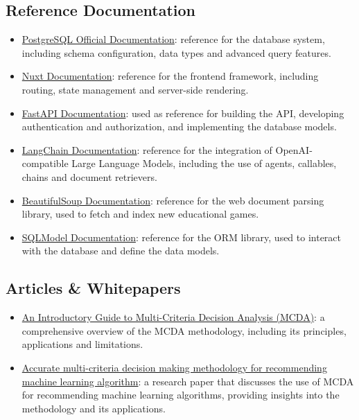 \documentclass[11pt,italian,a4paper]{article}
\begin{document}
\subsection{Reference Documentation}
\begin{itemize}
    \item \href{https://www.postgresql.org/docs/current/}{PostgreSQL Official Documentation}: reference for the database system, including schema configuration, data types and advanced query features.
    \item \href{https://nuxt.com/docs/getting-started/introduction}{Nuxt Documentation}: reference for the frontend framework, including routing, state management and server-side rendering.
    \item \href{https://fastapi.tiangolo.com/tutorial/}{FastAPI Documentation}: used as reference for building the API, developing authentication and authorization, and implementing the database models.
    \item \href{https://langchain.com/docs/get_started/introduction.html}{LangChain Documentation}: reference for the integration of OpenAI-compatible Large Language Models, including the use of agents, callables, chains and document retrievers.
    \item \href{https://www.crummy.com/software/BeautifulSoup/bs4/doc/}{BeautifulSoup Documentation}: reference for the web document parsing library, used to fetch and index new educational games.
    \item \href{https://sqlmodel.tiangolo.com/}{SQLModel Documentation}: reference for the ORM library, used to interact with the database and define the data models.
\end{itemize}

\subsection{Articles \& Whitepapers}
\begin{itemize}
    \item \href{https://analysisfunction.civilservice.gov.uk/policy-store/an-introductory-guide-to-mcda/}{An Introductory Guide to Multi-Criteria Decision Analysis (MCDA)}: a comprehensive overview of the MCDA methodology, including its principles, applications and limitations.
    \item \href{https://www.sciencedirect.com/science/article/pii/S0957417416306698}{Accurate multi-criteria decision making methodology for recommending machine learning algorithm}: a research paper that discusses the use of MCDA for recommending machine learning algorithms, providing insights into the methodology and its applications.
\end{itemize}
\end{document}
